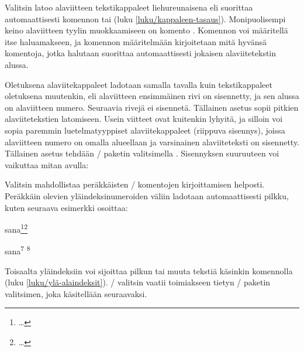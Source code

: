 Valitsin  latoo alaviitteen tekstikappaleet
liehureunaisena eli suorittaa automaattisesti komennon
 tai  (luku
\ref{luku/kappaleen-tasaus}). Monipuolisempi keino alaviitteen tyylin
muokkaamiseen on komento . Komennon voi
määritellä itse haluamakseen, ja komennon määritelmään kirjoitetaan mitä
hyvänsä komentoja, jotka halutaan suorittaa automaattisesti jokaisen
alaviitetekstin alussa.

\begin{koodilohkosis}
\renewcommand{\footnotelayout}{\raggedright}
\end{koodilohkosis}

\noindent
Oletuksena alaviitekappaleet ladotaan samalla tavalla kuin
tekstikappaleet oletuksena muutenkin, eli alaviitteen ensimmäinen rivi
on sisennetty, ja sen alussa on alaviitteen numero. Seuraavia rivejä ei
sisennetä. Tällainen asetus sopii pitkien alaviitetekstien latomiseen.
Usein viitteet ovat kuitenkin lyhyitä, ja silloin voi sopia paremmin
luetelmatyyppiset alaviitekappaleet (riippuva sisennys), joissa
alaviitteen numero on omalla alueellaan ja varsinainen alaviiteteksti on
sisennetty. Tällainen asetus tehdään \-/ paketin
valitsimella . Sisennyksen suuruuteen voi vaikuttaa mitan
 avulla:

\begin{koodilohkosis}
\usepackage[hang]{footmisc}
\setlength{\footnotemargin}{.8em}
\end{koodilohkosis}

\noindent
Valitsin  mahdollistaa peräkkäisten
\-/ komentojen kirjoittamisen helposti. Peräkkäin
olevien yläindeksinumeroiden väliin ladotaan automaattisesti pilkku,
kuten seuraava esimerkki osoittaa:

\begin{koodilohkosis}
sana\footnote{…}\footnote{…}
\end{koodilohkosis}

\begin{tulossis}
  sana\textsuperscript{7}%
  \yipilkku%
  \textsuperscript{8}
\end{tulossis}

\noindent
Toisaalta yläindeksiin voi sijoittaa pilkun tai muuta tekstiä käsinkin
komennolla  (luku \ref{luku/ylä-alaindeksit}).
\-/ valitsin vaatii toimiakseen tietyn
\-/ paketin valitsimen, joka käsitellään seuraavaksi.

